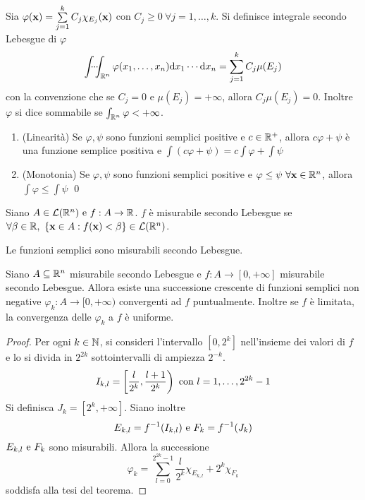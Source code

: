 \begin{definition}
	Sia $\varphi(\vb{x})=\sum\limits_{j=1}^k C_j \chi_{E_j}(\vb{x})$ con $C_j \geq 0 \ \forall j=1,\dots,k$. Si definisce integrale secondo Lebesgue di $\varphi$
	$$
		\idotsint_{\mathbb{R}^n}\varphi(x_1,\dots,x_n)\dd x_1 \cdots \dd x_n = \sum_{j=1}^kC_j\mu(E_j)
	$$
	con la convenzione che se $C_j=0$ e $\mu(E_j)=+\infty$, allora $C_j\mu(E_j)=0$.
	Inoltre $\varphi$ si dice sommabile se $\int_{\mathbb{R}^n} \varphi < + \infty$.
\end{definition}

\begin{theorem}
	\leavevmode
	\begin{enumerate}
		\item (Linearità) Se $\varphi,\psi$ sono funzioni semplici positive e $c\in \mathbb{R}^+$, allora $c\varphi + \psi$ è una funzione semplice positiva e $\int(c\varphi + \psi)=c\int\varphi +\int\psi$
		\item (Monotonia) Se $\varphi, \psi$ sono funzioni semplici positive e $\varphi \leq \psi \ \forall \vb{x} \in \mathbb{R}^n$, allora  $\int \varphi \leq \int \psi$
		\qed
	\end{enumerate}
\end{theorem}

\begin{definition}
	Siano $A \in \mathcal{L}(\mathbb{R}^n) \text{ e } f:A\to \mathbb{R}$. $f$ è misurabile secondo Lebesgue se $\forall \beta \in \mathbb{R}, \ \{\vb{x}\in A:f(\vb{x})<\beta\} \in \mathcal{L}(\mathbb{R}^n)$.
\end{definition}

\begin{remark}
	Le funzioni semplici sono misurabili secondo Lebesgue.
\end{remark}

\begin{theorem}
	Siano $A \subseteq \mathbb{R}^n$ misurabile secondo Lebesgue e $f:A\to [0,+\infty]$ misurabile secondo Lebesgue. Allora esiste una successione crescente di funzioni semplici non negative $\varphi_k:A\to [0,+\infty)$ convergenti ad $f$ puntualmente. Inoltre se $f$ è limitata, la convergenza delle $\varphi_k$ a $f$ è uniforme.
\end{theorem}

\begin{proof}
	Per ogni $k\in \mathbb{N}$, si consideri l'intervallo $[0,2^k]$ nell'insieme dei valori di $f$ e lo si divida in $2^{2k}$ sottointervalli di ampiezza $2^{-k}$.
	$$
		I_{k,l}=\left[\frac{l}{2^k},\frac{l+1}{2^k}\right) \text{ con } l=1,\dots,2^{2k}-1
	$$
	Si definisca $J_k=[2^k,+\infty]$. Siano inoltre
	$$
		E_{k,l}=f^{-1}(I_{k,l}) \text{ e } F_k=f^{-1}(J_k)
	$$
	$E_{k,l} \text{ e } F_k$ sono misurabili. Allora la successione
	$$
		\varphi_k=\sum_{l=0}^{2^{2k}-1}\frac{l}{2^k}\chi_{E_{k,l}}+2^k\chi_{F_k}
	$$
	soddisfa alla tesi del teorema.   
\end{proof}


